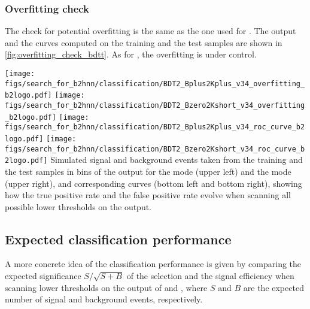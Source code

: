 \subsubsection*{Overfitting check}
The check for potential \bdtt overfitting is the same as the one used for \bdto.
The \bdtt output and the \ROC curves computed on the training and the test samples are shown in \cref{fig:overfitting_check_bdtt}.
As for \bdto, the overfitting is under control.

{
\texttt{[image: figs/search\_for\_b2hnn/classification/BDT2\_Bplus2Kplus\_v34\_overfitting\_b2logo.pdf]}
\texttt{[image: figs/search\_for\_b2hnn/classification/BDT2\_Bzero2Kshort\_v34\_overfitting\_b2logo.pdf]}
\texttt{[image: figs/search\_for\_b2hnn/classification/BDT2\_Bplus2Kplus\_v34\_roc\_curve\_b2logo.pdf]}
\texttt{[image: figs/search\_for\_b2hnn/classification/BDT2\_Bzero2Kshort\_v34\_roc\_curve\_b2logo.pdf]}
}
{
Simulated signal and background events taken from the training and the test samples in bins of the \bdtt output for the \BKpnn mode (upper left) and the \BKznn mode (upper right), and corresponding \ROC curves (bottom left and bottom right), showing how the true positive rate and the false positive rate evolve when scanning all possible lower thresholds on the \bdtt output.
}
\subsection{Expected classification performance} \label{sec:classification_performance}
A more concrete idea of the classification performance is given by comparing the expected significance $S/\sqrt{S+B}$ of the selection and the signal efficiency when scanning lower thresholds on the output of \bdto and \bdtt, where $S$ and $B$ are the expected number of signal and background events, respectively.

